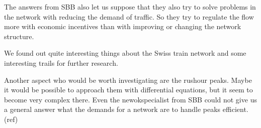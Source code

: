 \documentclass[11pt]{article}
\begin{document}
The answers from SBB also let us suppose that they also try to solve problems in the network with reducing the demand of traffic. So they try to regulate the flow more with economic incentives than with improving or changing the network structure.

We found out quite interesting things about the Swiss train network and some interesting trails for further research.\newline

Another aspect who would be worth investigating are the rushour peaks. Maybe it would be possible to approach them with differential equations, but it seem to become very complex there. Even the newokspecialist from SBB could not  give us a general answer what the demands for a network are to handle peaks efficient. (ref)








\newpage
\end{document}
